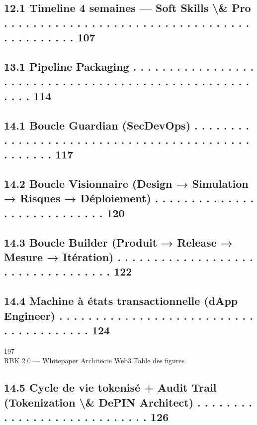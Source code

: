 \documentclass[12pt,landscape,a4paper]{article}
\begin{document}
\subsection{12.1 Timeline 4 semaines — Soft Skills \textbackslash{}& Pro . . . . . . . . . . . . . . . . . . . . . . . . . . . . . . . . . . . . . . . . . . . . 107}
\vspace{0.5em}
\subsection{13.1 Pipeline Packaging . . . . . . . . . . . . . . . . . . . . . . . . . . . . . . . . . . . . . . . . . . . . . . . . . . . . . . . 114}
\vspace{0.5em}
\subsection{14.1 Boucle Guardian (SecDevOps) . . . . . . . . . . . . . . . . . . . . . . . . . . . . . . . . . . . . . . . . . . . . . . . . . 117}
\subsection{14.2 Boucle Visionnaire (Design → Simulation → Risques → Déploiement) . . . . . . . . . . . . . . . . . . . . . . . . . . . . 120}
\subsection{14.3 Boucle Builder (Produit → Release → Mesure → Itération) . . . . . . . . . . . . . . . . . . . . . . . . . . . . . . . . . . 122}
\subsection{14.4 Machine à états transactionnelle (dApp Engineer) . . . . . . . . . . . . . . . . . . . . . . . . . . . . . . . . . . . . . . . 124}
\vspace{0.5em}
\vspace{0.5em}
\vspace{0.5em}
197\\
RBK 2.0 — Whitepaper Architecte Web3                                                                                        Table des figures\\
\vspace{0.5em}
\vspace{0.5em}
\subsection{14.5 Cycle de vie tokenisé + Audit Trail (Tokenization \textbackslash{}& DePIN Architect) . . . . . . . . . . . . . . . . . . . . . . . . . . . . 126}
\vspace{0.5em}
\end{document}
